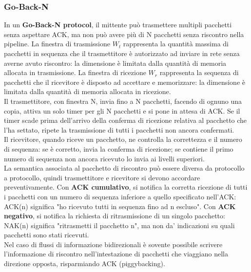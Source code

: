 \documentclass[11pt]{article}
\begin{document}
\subsubsection{Go-Back-N}
In un \textbf{Go-Back-N protocol}, il mittente può trasmettere multipli pacchetti senza aspettare ACK, ma non può avere 
più di N pacchetti senza riscontro nella pipeline. La finestra di trasmissione $W_t$ rappresenta la quantità massima di 
pacchetti in sequenza che il trasmettitore è autorizzato ad inviare in rete senza averne avuto riscontro: la dimensione 
è limitata dalla quantità di memoria allocata in trasmissione. La finestra di ricezione $W_r$ rappresenta la sequenza di 
pacchetti che il ricevitore è disposto ad accettare e memorizzare: la dimensione è limitata dalla quantità di memoria 
allocata in ricezione.\\
Il trasmettitore, con finestra N, invia fino a N pacchetti, facendo di ognuno una copia, attiva un solo timer per gli N 
pacchetti e si pone in attesa di ACK. Se il timer scade prima dell'arrivo della conferma di ricezione relativa al 
pacchetto che l'ha settato, ripete la trasmissione di tutti i pacchetti non ancora confermati.\\
Il ricevitore, quando riceve un pacchetto, ne controlla la correttezza e il numero di sequenza: se è corretto, invia la 
conferma di ricezione; se contiene il primo numero di sequenza non ancora ricevuto lo invia ai livelli superiori.\\
La semantica associata al pacchetto di riscontro può essere diversa da protocollo a protocollo, quindi trasmettitore e 
ricevitore si devono accordare preventivamente. Con \textbf{ACK cumulativo}, si notifica la corretta ricezione di tutti 
i pacchetti con un numero di sequenza inferiore a quello specificato nell'ACK: ACK(n) significa "ho ricevuto tutti in 
sequenza fino ad n escluso". Con \textbf{ACK negativo}, si notifica la richiesta di ritrasmissione di un singolo pacchetto:
NAK(n) significa "ritrasmetti il pacchetto n", ma non da' indicazioni su quali pacchetti sono stati ricevuti.\\
Nel caso di flussi di informazione bidirezionali è sovente possibile scrivere l'informazione di riscontro nell'intestazione 
di pacchetti che viaggiano nella direzione opposta, risparmiando ACK (piggybacking).\\
\end{document}
